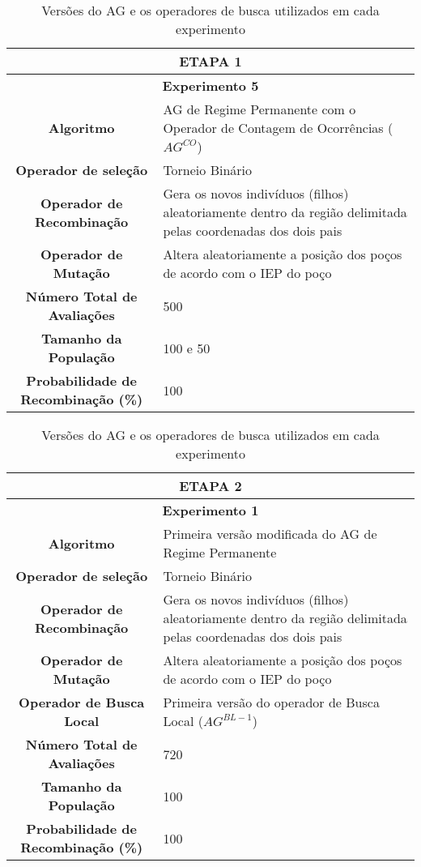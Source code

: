  \begin{table}[H]
\centering
\caption{Versões do AG e os operadores de busca utilizados em cada experimento}

\begin{tabular}{|c|p{9cm}|}
 \hline
  \multicolumn{2}{|c|}{ETAPA 1} \\ \hline
  \multicolumn{2}{|c|}{\textbf{Experimento 5}} \\ \hline
\textbf{Algoritmo} &AG de Regime Permanente com o Operador de Contagem de Ocorrências ($AG^{CO}$) \\ \hline
 \textbf{Operador de seleção} & Torneio Binário \\ \hline
 \textbf{Operador de Recombinação} & Gera os novos indivíduos (filhos) aleatoriamente dentro da região delimitada pelas coordenadas dos dois pais \\  \hline
 \textbf{Operador de Mutação} & Altera aleatoriamente a posição dos poços de acordo com o IEP do poço \\ \hline
 \textbf{Número Total de Avaliações} & 500 \\ \hline
 \textbf{Tamanho da População} & 100 e 50 \\ \hline
 \textbf{Probabilidade de Recombinação (\%)} & 100 \\ \hline
 
 
\end{tabular}
\end{table} 
 
 \begin{table}[H]
\centering
\caption{Versões do AG e os operadores de busca utilizados em cada experimento}

\begin{tabular}{|c|p{9cm}|}
 \hline
 \multicolumn{2}{|c|}{ETAPA 2} \\ \hline
 \multicolumn{2}{|c|}{\textbf{Experimento 1}} \\ \hline
 \textbf{Algoritmo} & Primeira versão modificada do AG de Regime Permanente  \\ \hline
 \textbf{Operador de seleção} & Torneio Binário \\ \hline
 \textbf{Operador de Recombinação} & Gera os novos indivíduos (filhos) aleatoriamente dentro da região delimitada pelas coordenadas dos dois pais \\  \hline
 \textbf{Operador de Mutação} & Altera aleatoriamente a posição dos poços de acordo com o IEP do poço \\ \hline
 \textbf{Operador de Busca Local} & Primeira versão do operador de Busca Local ($AG^{BL-1}$) \\ \hline
 \textbf{Número Total de Avaliações} & 720 \\ \hline
 \textbf{Tamanho da População} & 100 \\ \hline
 \textbf{Probabilidade de Recombinação (\%)} & 100 \\ \hline
 
 
\end{tabular}
\end{table} 
 
